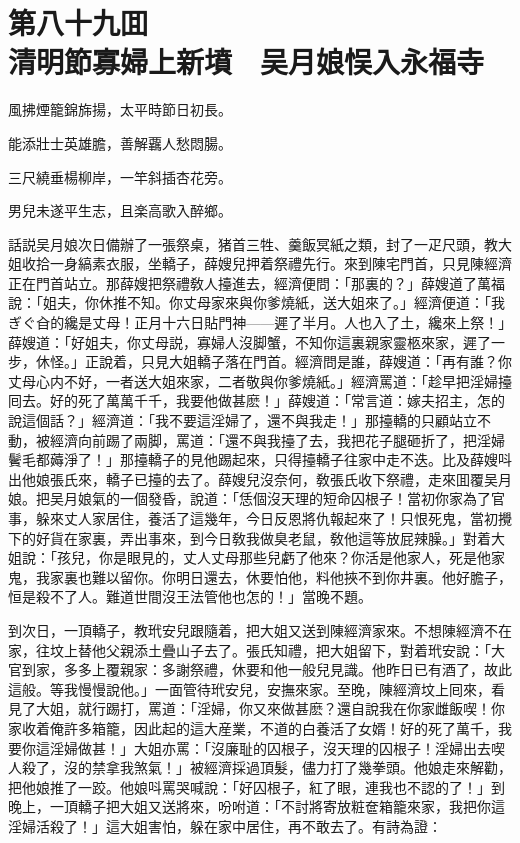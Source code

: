 
\chapter*{第八十九囬　\\清明節寡婦上新墳　吴月娘悮入永福寺}
\thispagestyle{empty}

\begin{myquote}
風拂煙籠錦旆揚，太平時節日初長。

能添壯士英雄膽，善解覊人愁悶腸。

三尺繞垂楊柳岸，一竿斜插杏花旁。

男兒未遂平生志，且楽高歌入醉鄉。
\end{myquote}

話説吴月娘次日備辦了一張祭桌，猪首三牲、羹飯冥紙之類，封了一疋尺頭，教大姐收拾一身縞素衣服，坐轎子，薛嫂兒押着祭禮先行。來到陳宅門首，只見陳經濟正在門首站立。那薛嫂把祭禮敎人擡進去，經濟便問：「那裏的？」薛嫂道了萬福說：「姐夫，你休推不知。你丈母家來與你爹燒紙，送大姐來了。」經濟便道：「我ぎぐ㒲的纔是丈母！正月十六日貼門神——遲了半月。人也入了土，纔來上祭！」薛嫂道：「好姐夫，你丈母説，寡婦人沒脚蟹，不知你這裏親家靈柩來家，遲了一步，休怪。」正說着，只見大姐轎子落在門首。經濟問是誰，薛嫂道：「再有誰？你丈母心内不好，一者送大姐來家，二者敬與你爹燒紙。」經濟罵道：「趁早把淫婦擡囘去。好的死了萬萬千千，我要他做甚麽！」薛嫂道：「常言道：嫁夫招主，怎的說這個話？」經濟道：「我不要這淫婦了，還不與我走！」那擡轎的只顧站立不動，被經濟向前踢了兩脚，罵道：「還不與我擡了去，我把花子腿砸折了，把淫婦鬢毛都薅淨了！」那擡轎子的見他踢起來，只得擡轎子往家中走不迭。比及薛嫂呌出他娘張氏來，轎子已擡的去了。薛嫂兒沒奈何，敎張氏收下祭禮，走來囬覆吴月娘。把吴月娘氣的一個發昏，說道：「恁個沒天理的短命囚根子！當初你家為了官事，躲來丈人家居住，養活了這幾年，今日反恩將仇報起來了！只恨死鬼，當初攪下的好貨在家裏，弄出事來，到今日敎我做臭老鼠，敎他這等放屁辣臊。」對着大姐說：「孩兒，你是眼見的，丈人丈母那些兒虧了他來？你活是他家人，死是他家鬼，我家裏也難以留你。你明日還去，休要怕他，料他挾不到你井裏。他好膽子，恒是殺不了人。難道世間沒王法管他也怎的！」當晚不題。

到次日，一頂轎子，教玳安兒跟隨着，把大姐又送到陳經濟家來。不想陳經濟不在家，往坟上替他父親添土疊山子去了。張氏知禮，把大姐留下，對着玳安說：「大官到家，多多上覆親家：多謝祭禮，休要和他一般兒見識。他昨日已有酒了，故此這般。等我慢慢說他。」一面管待玳安兒，安撫來家。至晚，陳經濟坟上囘來，看見了大姐，就行踢打，罵道：「淫婦，你又來做甚麽？還自說我在你家雌飯喫！你家收着俺許多箱籠，因此起的這大産業，不道的白養活了女婿！好的死了萬千，我要你這淫婦做甚！」大姐亦罵：「沒廉耻的囚根子，沒天理的囚根子！淫婦出去喫人殺了，沒的禁拿我煞氣！」被經濟採過頂髮，儘力打了幾拳頭。他娘走來解勸，把他娘推了一跤。他娘呌罵哭喊說：「好囚根子，紅了眼，連我也不認的了！」到晚上，一頂轎子把大姐又送將來，吩咐道：「不討將寄放粧奩箱籠來家，我把你這淫婦活殺了！」這大姐害怕，躲在家中居住，再不敢去了。有詩為證：

